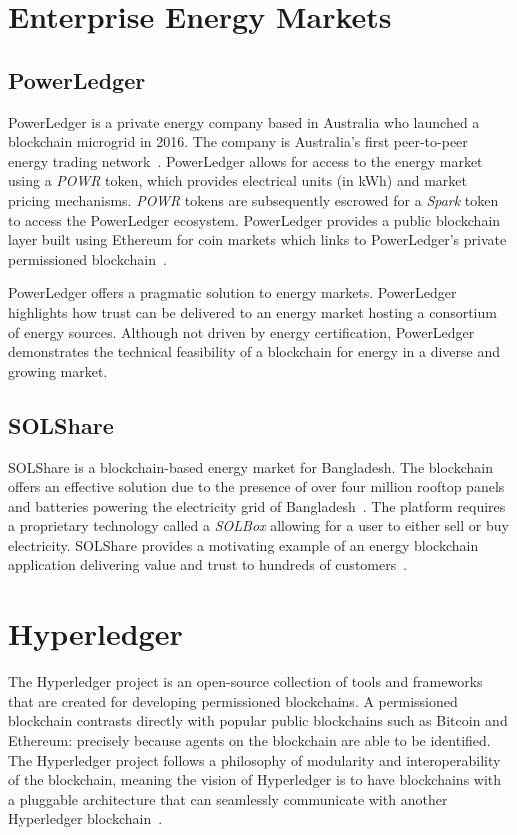 \section{Enterprise Energy Markets}

\subsection{PowerLedger}

PowerLedger is a private energy company based in Australia
who launched a blockchain microgrid in 2016. The company is
Australia's first peer-to-peer energy trading network~\cite{power}. PowerLedger allows for access to the
energy market using a \textit{POWR} token, which provides
electrical units (in kWh) and market pricing
mechanisms. \textit{POWR} tokens are subsequently
escrowed for a \textit{Spark} token to access the
PowerLedger ecosystem. PowerLedger provides a public
blockchain layer built using Ethereum for
coin markets which links to PowerLedger's private
permissioned blockchain~\cite{power}.

PowerLedger offers a pragmatic solution to energy markets.
PowerLedger highlights how trust can be delivered to
an energy market hosting a consortium of energy sources.
Although not driven by energy certification, PowerLedger
demonstrates the technical feasibility of
a blockchain for energy in a diverse and growing market.

\subsection{SOLShare}

SOLShare is a blockchain-based energy market
for Bangladesh. The blockchain offers an effective solution
due to the presence of over four million
rooftop panels and batteries powering the electricity grid of
Bangladesh~\cite{powersol}. The platform requires
a proprietary technology called a \textit{SOLBox} allowing for
a user to either sell or buy electricity. SOLShare
provides a motivating example of an energy
blockchain application delivering value and trust to
hundreds of customers~\cite{powersol}.

\section{Hyperledger}
The Hyperledger project is an open-source collection of tools and
frameworks that are created for developing permissioned blockchains.
A permissioned blockchain contrasts directly with popular
public blockchains such as Bitcoin and Ethereum: precisely
because agents on the blockchain are able to be identified.
The Hyperledger project follows a philosophy of modularity
and interoperability of the blockchain, meaning the
vision of Hyperledger is to have blockchains with a pluggable architecture
that can seamlessly communicate with another Hyperledger blockchain~\cite{hypa}.


